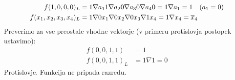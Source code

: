 \begin{resitev}
\begin{align*}
f(1,0,0,0)_L & = 1 \nabla a_1 1 \nabla a_2 0 \nabla a_3 0 \nabla a_4 0 = 1 \nabla a_1 = 1 \quad (a_1 = 0)\\
f(x_1,x_2, x_3, x_4)_L &= 1 \nabla 0 x_1 \nabla 0 x_2 \nabla 0 x_3 \nabla 1 x_4 = 1 \nabla x_4 = \overline x_4
\end{align*}
Preverimo za vse preostale vhodne vektorje (v primeru protislovja postopek ustavimo):
\begin{align*}
f(0,0,1,1) &= 1 \\
f(0,0,1,1)_L &= 1 \nabla 1 = 0
\end{align*}
Protislovje. Funkcija ne pripada razredu.
\end{resitev}
